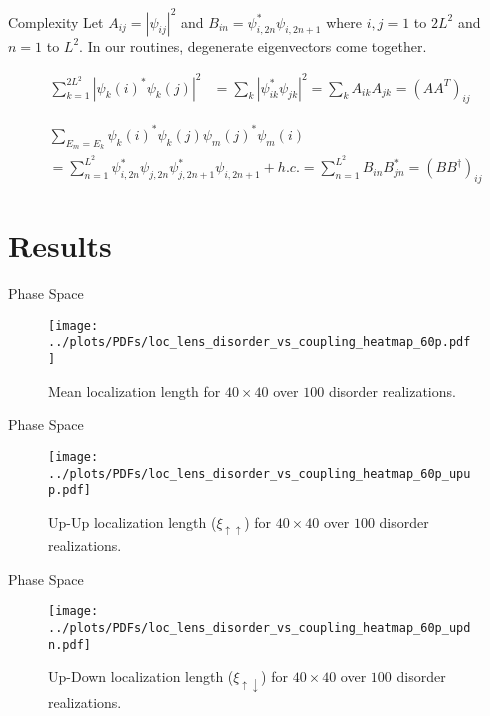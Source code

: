 \documentclass[]{beamer}
\begin{document}
\begin{frame}{Complexity}
    Let $A_{ij} = |\psi_{ij}|^2$ and $B_{in} = \psi_{i,2n}^*
    \psi_{i,2n+1}$ where $i,j = 1$ to $2L^2$ and $n = 1$ to
    $L^2$. In our routines, degenerate eigenvectors come
    together.

    \begin{align*}
        \sum_{k=1}^{2L^2} |\psi_k(i)^* \psi_k(j)|^2 &= \sum_{k}|\psi_{ik}^*\psi_{jk}|^2 = \sum_k A_{ik}A_{jk} = (AA^T)_{ij}
    \end{align*}

    \begin{align*}
        &\sum_{E_m = E_k} \psi_k(i)^*\psi_k(j)\psi_m(j)^*\psi_m(i)\\
        &= \sum_{n=1}^{L^2} \psi_{i,2n}^* \psi_{j,2n} \psi_{j,2n+1}^* \psi_{i,2n+1}
        + h.c.
        = \sum_{n=1}^{L^2} B_{in} B_{jn}^* = (B B^\dagger)_{ij}
    \end{align*}    
\end{frame}

\section{Results}
\begin{frame}{Phase Space}
    \begin{figure}
        \centering
        \texttt{[image: ../plots/PDFs/loc\_lens\_disorder\_vs\_coupling\_heatmap\_60p.pdf]}
        \caption{Mean localization length for $40\times40$ over $100$ disorder realizations.}
    \end{figure}    
\end{frame}

\begin{frame}{Phase Space}
    \begin{figure}
        \centering
        \texttt{[image: ../plots/PDFs/loc\_lens\_disorder\_vs\_coupling\_heatmap\_60p\_upup.pdf]}
        \caption{Up-Up localization length ($\xi_{\uparrow\uparrow}$) for $40\times40$ over $100$ disorder realizations.}
    \end{figure}    
\end{frame}

\begin{frame}{Phase Space}
    \begin{figure}
        \centering
        \texttt{[image: ../plots/PDFs/loc\_lens\_disorder\_vs\_coupling\_heatmap\_60p\_updn.pdf]}
        \caption{Up-Down localization length ($\xi_{\uparrow\downarrow}$) for $40\times40$ over $100$ disorder realizations.}
    \end{figure}    
\end{frame}
\end{document}
